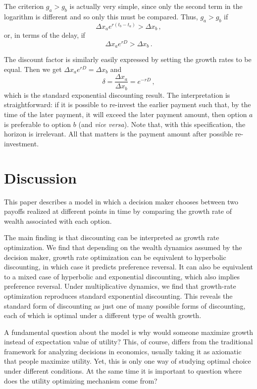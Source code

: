 \documentclass[11pt]{article}
\newcommand{\be}{\begin{equation}}
\newcommand{\ee}{\end{equation}}
\newcommand{\Dx}{\Delta x}
\newcommand{\del}{D}
\numberwithin{equation}{section}
\begin{document}
The criterion $g_a > g_b$ is actually very simple, since only the second term in the logarithm is different and so only this must be compared. Thus, $g_a > g_b$ if
\be
\Dx_a e^{r(t_b-t_a)} > \Dx_b\,,
\ee
or, in terms of the delay, if
\be
\Dx_a e^{r\del} > \Dx_b\,.
\ee

The discount factor is similarly easily expressed by setting the growth rates to be equal. Then we get $\Dx_a e^{r\del} = \Dx_b$ and
\be
\delta = \frac{\Dx_a}{\Dx_b} = e^{-r\del}\,,
\ee
which is the standard exponential discounting result. The interpretation is straightforward: if it is possible to re-invest the earlier payment such that, by the time of the later payment, it will exceed the later payment amount, then option $a$ is preferable to option $b$ (and \textit{vice versa}). Note that, with this specification, the horizon is irrelevant. All that matters is the payment amount after possible re-investment.

\section{Discussion}\label{sec:discussion}

This paper describes a model in which a decision maker chooses between two payoffs realized at different points in time by comparing the growth rate of wealth associated with each option.

The main finding is that discounting can be interpreted as growth rate optimization. We find that depending on the wealth dynamics assumed by the decision maker, growth rate optimization can be equivalent to hyperbolic discounting, in which case it predicts preference reversal. It can also be equivalent to a mixed case of hyperbolic and exponential discounting, which also implies preference reversal. Under multiplicative dynamics, we find that growth-rate optimization reproduces standard exponential discounting. This reveals the standard form of discounting as just one of many possible forms of discounting, each of which is optimal under a different type of wealth growth.

A fundamental question about the model is why would someone maximize growth instead of expectation value of utility? This, of course, differs from the traditional framework for analyzing decisions in economics, usually taking it as axiomatic that people maximize utility. Yet, this is only one way of studying optimal choice under different conditions. At the same time it is important to question where does the utility optimizing mechanism come from?
\end{document}
